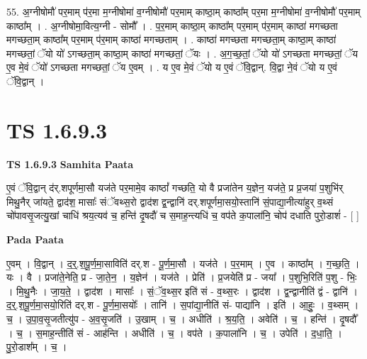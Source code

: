 \documentclass[17pt]{extarticle}
\begin{document}
55. अ॒ग्नीषोमौ॑ पर॒माम् प॑र॒मा म॒ग्नीषोमा॑ व॒ग्नीषोमौ॑ पर॒माम् काष्ठा॒म् काष्ठा᳚म् पर॒मा म॒ग्नीषोमा॑ व॒ग्नीषोमौ॑ पर॒माम् काष्ठा᳚म् । . अ॒ग्नीषोमा॒वित्य॒ग्नी - सोमौ᳚ । . प॒र॒माम् काष्ठा॒म् काष्ठा᳚म् पर॒माम् प॑र॒माम् काष्ठा॑ मगच्छता मगच्छता॒म् काष्ठा᳚म् पर॒माम् प॑र॒माम् काष्ठा॑ मगच्छताम् । . काष्ठा॑ मगच्छता मगच्छता॒म् काष्ठा॒म् काष्ठा॑ मगच्छतां॒ ॅयो यो॑ ऽगच्छता॒म् काष्ठा॒म् काष्ठा॑ मगच्छतां॒ ॅयः । . अ॒ग॒च्छ॒तां॒ ॅयो यो॑ ऽगच्छता मगच्छतां॒ ॅय ए॒व मे॒वं ॅयो॑ ऽगच्छता मगच्छतां॒ ॅय ए॒वम् । . य ए॒व मे॒वं ॅयो य ए॒वं ॅवि॒द्वान्. वि॒द्वा ने॒वं ॅयो य ए॒वं ॅवि॒द्वान् । \newline
\pagebreak
{}

\section{ TS 1.6.9.3 }

\textbf{TS 1.6.9.3 } \newline
\textbf{Samhita Paata} \newline

ए॒वं ॅवि॒द्वान् द॑र्.शपूर्णमा॒सौ यज॑ते पर॒मामे॒व काष्ठां᳚ गच्छति॒ यो वै प्रजा॑तेन य॒ज्ञेन॒ यज॑ते॒ प्र प्र॒जया॑ प॒शुभि॑र् मिथु॒नैर् जा॑यते॒ द्वाद॑श॒ मासाः᳚ संॅवथ्स॒रो द्वाद॑श द्व॒न्द्वानि॑ दर्.शपूर्णमा॒सयो॒स्तानि॑ सं॒पाद्या॒नीत्या॑हुर् व॒थ्सं चो॑पावसृ॒जत्यु॒खां चाधि॑ श्रय॒त्यव॑ च॒ हन्ति॑ दृ॒षदौ॑ च स॒माह॒न्त्यधि॑ च॒ वप॑ते क॒पाला॑नि॒ चोप॑ दधाति पुरो॒डाशं॑ - [ ] \newline

\textbf{Pada Paata} \newline

ए॒वम् । वि॒द्वान् । द॒र्॒.श॒पू॒र्ण॒मा॒साविति॑ दर्.श - पू॒र्ण॒मा॒सौ । यज॑ते । प॒र॒माम् । ए॒व । काष्ठा᳚म् । ग॒च्छ॒ति॒ । यः । वै । प्रजा॑ते॒नेति॒ प्र - जा॒ते॒न॒ । य॒ज्ञेन॑ । यज॑ते । प्रेति॑ । प्र॒जयेति॑ प्र - जया᳚ । प॒शुभि॒रिति॑ प॒शु - भिः॒ । मि॒थु॒नैः । जा॒य॒ते॒ । द्वाद॑श । मासाः᳚ । सं॒ॅव॒थ्स॒र इति॑ सं - व॒थ्स॒रः । द्वाद॑श । द्व॒न्द्वानीति॑ द्वं - द्वानि॑ । द॒र्॒.श॒पू॒र्ण॒मा॒सयो॒रिति॑ दर्.श - पू॒र्ण॒मा॒सयोः᳚ । तानि॑ । स॒पांद्या॒नीति॑ सं- पाद्या॑नि । इति॑ । आ॒हुः॒ । व॒थ्सम् । च॒ । उ॒पा॒व॒सृ॒जतीत्यु॑प - अ॒व॒सृ॒जति॑ । उ॒खाम् । च॒ । अधीति॑ । श्र॒य॒ति॒ । अवेति॑ । च॒ । हन्ति॑ । दृ॒षदौ᳚ । च॒ । स॒माह॒न्तीति॑ सं - आह॑न्ति । अधीति॑ । च॒ । वप॑ते । क॒पाला॑नि । च॒ । उपेति॑ । द॒धा॒ति॒ । पु॒रो॒डाश᳚म् । च॒ ।  \newline
\end{document}
